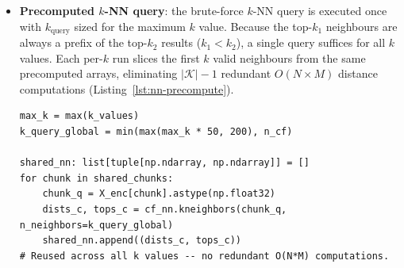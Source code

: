 \begin{itemize}
\begin{lstlisting}[style=pipeline,caption={Pre-allocated hybrid encoding (\texttt{src/feature\_importance.py}).},label={lst:encode-hybrid}]
def encode_hybrid(df, rank_maps, nominal_maps, feature_cols):
    n = len(df)
    total_cols = n_encoded_cols(feature_cols, rank_maps, nominal_maps)
    # Pre-allocate: one contiguous block instead of many small arrays.
    out = np.empty((n, total_cols), dtype=np.float32)
    col_ptr = 0

    for col in feature_cols:
        if col in rank_maps:
            # Ordinal: rank -> min-max normalised to [0, 1]
            rmap     = rank_maps[col]
            max_rank = max(rmap.values())
            denom    = float(max_rank - 1) if max_rank > 1 else 1.0
            norm_map = {cat: (rank - 1) / denom for cat, rank in rmap.items()}
            out[:, col_ptr] = (
                df[col].map(norm_map).fillna(0.5)
                .to_numpy(dtype=np.float32)
            )
            col_ptr += 1
        else:
            # Nominal: one-hot / 2 -> each bit in {0.0, 0.5}
            cats = nominal_maps.get(col, [])
            col_vals = df[col].to_numpy()
            for cat in cats:
                out[:, col_ptr] = (col_vals == cat).astype(np.float32) * 0.5
                col_ptr += 1
    return out
\end{lstlisting}

  \item \textbf{Precomputed $k$-NN query}: the brute-force $k$-NN query is executed once with $k_{\text{query}}$ sized for the maximum $k$ value.
  Because the top-$k_1$ neighbours are always a prefix of the top-$k_2$ results ($k_1 < k_2$), a single query suffices for all $k$ values.
  Each per-$k$ run slices the first $k$ valid neighbours from the same precomputed arrays, eliminating $|\mathcal{K}|-1$ redundant $O(N \times M)$ distance computations (Listing~\ref{lst:nn-precompute}).

\begin{lstlisting}[style=pipeline,caption={Single $k$-NN precomputation reused across all $k$ values (\texttt{src/feature\_importance.py}).},label={lst:nn-precompute}]
max_k = max(k_values)
k_query_global = min(max(max_k * 50, 200), n_cf)

shared_nn: list[tuple[np.ndarray, np.ndarray]] = []
for chunk in shared_chunks:
    chunk_q = X_enc[chunk].astype(np.float32)
    dists_c, tops_c = cf_nn.kneighbors(chunk_q, n_neighbors=k_query_global)
    shared_nn.append((dists_c, tops_c))
# Reused across all k values -- no redundant O(N*M) computations.
\end{lstlisting}


\end{itemize}
